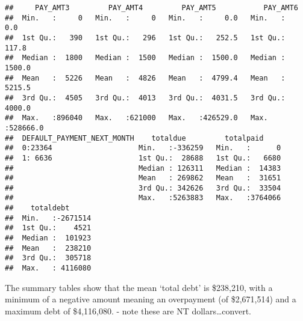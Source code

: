 \documentclass[]{article}
\newenvironment{Shaded}{\begin{snugshade}}{\end{snugshade}}
\newcommand{\KeywordTok}[1]{\textcolor[rgb]{0.13,0.29,0.53}{\textbf{#1}}}
\newcommand{\CommentTok}[1]{\textcolor[rgb]{0.56,0.35,0.01}{\textit{#1}}}
\newcommand{\OperatorTok}[1]{\textcolor[rgb]{0.81,0.36,0.00}{\textbf{#1}}}
\newcommand{\NormalTok}[1]{#1}
\begin{document}
\begin{verbatim}
##     PAY_AMT3         PAY_AMT4         PAY_AMT5           PAY_AMT6       
##  Min.   :     0   Min.   :     0   Min.   :     0.0   Min.   :     0.0  
##  1st Qu.:   390   1st Qu.:   296   1st Qu.:   252.5   1st Qu.:   117.8  
##  Median :  1800   Median :  1500   Median :  1500.0   Median :  1500.0  
##  Mean   :  5226   Mean   :  4826   Mean   :  4799.4   Mean   :  5215.5  
##  3rd Qu.:  4505   3rd Qu.:  4013   3rd Qu.:  4031.5   3rd Qu.:  4000.0  
##  Max.   :896040   Max.   :621000   Max.   :426529.0   Max.   :528666.0  
##  DEFAULT_PAYMENT_NEXT_MONTH    totaldue         totalpaid      
##  0:23364                    Min.   :-336259   Min.   :      0  
##  1: 6636                    1st Qu.:  28688   1st Qu.:   6680  
##                             Median : 126311   Median :  14383  
##                             Mean   : 269862   Mean   :  31651  
##                             3rd Qu.: 342626   3rd Qu.:  33504  
##                             Max.   :5263883   Max.   :3764066  
##    totaldebt       
##  Min.   :-2671514  
##  1st Qu.:    4521  
##  Median :  101923  
##  Mean   :  238210  
##  3rd Qu.:  305718  
##  Max.   : 4116080
\end{verbatim}

The summary tables show that the mean `total debt' is \$238,210, with a
minimum of a negative amount meaning an overpayment (of \$2,671,514) and
a maximum debt of \$4,116,080. - note these are NT
dollars\ldots{}convert.

\begin{Shaded}
\end{Shaded}
\end{document}
